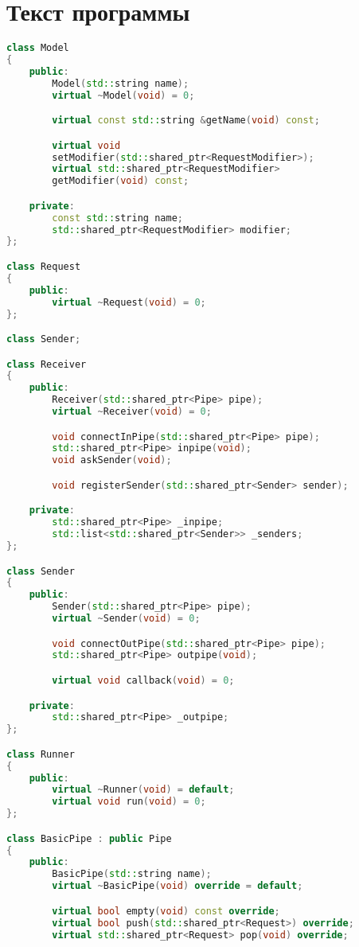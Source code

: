 \section*{Текст программы}
\begin{lstlisting}[caption={Реализация элементов системы}, language=c++]
class Model
{
    public:
        Model(std::string name);
        virtual ~Model(void) = 0;

        virtual const std::string &getName(void) const;

        virtual void
        setModifier(std::shared_ptr<RequestModifier>);
        virtual std::shared_ptr<RequestModifier>
        getModifier(void) const;

    private:
        const std::string name;
        std::shared_ptr<RequestModifier> modifier;
};

class Request
{
    public:
        virtual ~Request(void) = 0;
};

class Sender;

class Receiver
{
    public:
        Receiver(std::shared_ptr<Pipe> pipe);
        virtual ~Receiver(void) = 0;

        void connectInPipe(std::shared_ptr<Pipe> pipe);
        std::shared_ptr<Pipe> inpipe(void);
        void askSender(void);

        void registerSender(std::shared_ptr<Sender> sender);

    private:
        std::shared_ptr<Pipe> _inpipe;
        std::list<std::shared_ptr<Sender>> _senders;
};

class Sender
{
    public:
        Sender(std::shared_ptr<Pipe> pipe);
        virtual ~Sender(void) = 0;

        void connectOutPipe(std::shared_ptr<Pipe> pipe);
        std::shared_ptr<Pipe> outpipe(void);

        virtual void callback(void) = 0;

    private:
        std::shared_ptr<Pipe> _outpipe;
};

class Runner
{
    public:
        virtual ~Runner(void) = default;
        virtual void run(void) = 0;
};

class BasicPipe : public Pipe
{
    public:
        BasicPipe(std::string name);
        virtual ~BasicPipe(void) override = default;

        virtual bool empty(void) const override;
        virtual bool push(std::shared_ptr<Request>) override;
        virtual std::shared_ptr<Request> pop(void) override;


\end{lstlisting}
